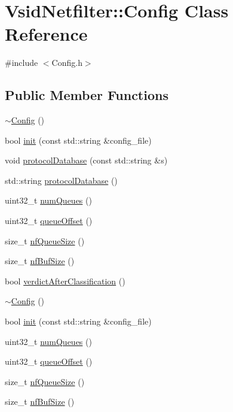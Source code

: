 \hypertarget{class_vsid_netfilter_1_1_config}{\section{Vsid\-Netfilter\-:\-:Config Class Reference}
\label{class_vsid_netfilter_1_1_config}
}


{\ttfamily \#include $<$Config.\-h$>$}

\subsection*{Public Member Functions}
\begin{DoxyCompactItemize}
\item 
\hyperlink{class_vsid_netfilter_1_1_config_a6f62f7e324a8efd1c08a2281fa17ac91}{$\sim$\-Config} ()
\item 
bool \hyperlink{class_vsid_netfilter_1_1_config_ab71f47ae61d96d9e791117d1ddc777f9}{init} (const std\-::string \&config\-\_\-file)
\item 
void \hyperlink{class_vsid_netfilter_1_1_config_ae34621f4ec48a1f8354f006b150098ab}{protocol\-Database} (const std\-::string \&s)
\item 
std\-::string \hyperlink{class_vsid_netfilter_1_1_config_ab8fff95b6c452c9f2818168f08043858}{protocol\-Database} ()
\item 
uint32\-\_\-t \hyperlink{class_vsid_netfilter_1_1_config_a911c8515f185b48bf4ad1cac8fa869d8}{num\-Queues} ()
\item 
uint32\-\_\-t \hyperlink{class_vsid_netfilter_1_1_config_a9812d0584ac789366f5419acec1a6c77}{queue\-Offset} ()
\item 
size\-\_\-t \hyperlink{class_vsid_netfilter_1_1_config_a13db25567cadb8aaaed7f543f6788500}{nf\-Queue\-Size} ()
\item 
size\-\_\-t \hyperlink{class_vsid_netfilter_1_1_config_a6873a15c546f7178ac6a66c06166c840}{nf\-Buf\-Size} ()
\item 
bool \hyperlink{class_vsid_netfilter_1_1_config_a6407d209ee22a73e2e2a9386d2e80a1c}{verdict\-After\-Classification} ()
\item 
\hyperlink{class_vsid_netfilter_1_1_config_a6f62f7e324a8efd1c08a2281fa17ac91}{$\sim$\-Config} ()
\item 
bool \hyperlink{class_vsid_netfilter_1_1_config_ab71f47ae61d96d9e791117d1ddc777f9}{init} (const std\-::string \&config\-\_\-file)
\item 
uint32\-\_\-t \hyperlink{class_vsid_netfilter_1_1_config_a911c8515f185b48bf4ad1cac8fa869d8}{num\-Queues} ()
\item 
uint32\-\_\-t \hyperlink{class_vsid_netfilter_1_1_config_a9812d0584ac789366f5419acec1a6c77}{queue\-Offset} ()
\item 
size\-\_\-t \hyperlink{class_vsid_netfilter_1_1_config_a13db25567cadb8aaaed7f543f6788500}{nf\-Queue\-Size} ()
\item 
size\-\_\-t \hyperlink{class_vsid_netfilter_1_1_config_a6873a15c546f7178ac6a66c06166c840}{nf\-Buf\-Size} ()
\end{DoxyCompactItemize}
